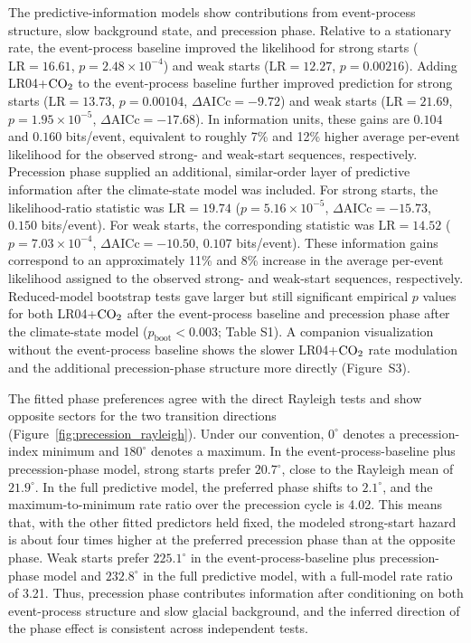 \documentclass[11pt]{article}
\begin{document}
The predictive-information models show contributions from event-process structure, slow background state, and precession phase.
Relative to a stationary rate, the event-process baseline improved the likelihood for strong starts (\(\mathrm{LR}=16.61\), \(p=2.48\times10^{-4}\)) and weak starts (\(\mathrm{LR}=12.27\), \(p=0.00216\)).
Adding LR04+\(\ce{CO2}\) to the event-process baseline further improved prediction for strong starts (\(\mathrm{LR}=13.73\), \(p=0.00104\), \(\Delta\mathrm{AICc}=-9.72\)) and weak starts (\(\mathrm{LR}=21.69\), \(p=1.95\times10^{-5}\), \(\Delta\mathrm{AICc}=-17.68\)).
In information units, these gains are \(0.104\) and \(0.160\) bits/event, equivalent to roughly 7\% and 12\% higher average per-event likelihood for the observed strong- and weak-start sequences, respectively.
Precession phase supplied an additional, similar-order layer of predictive information after the climate-state model was included.
For strong starts, the likelihood-ratio statistic was \(\mathrm{LR}=19.74\) (\(p=5.16\times10^{-5}\), \(\Delta\mathrm{AICc}=-15.73\), \(0.150\) bits/event).
For weak starts, the corresponding statistic was \(\mathrm{LR}=14.52\) (\(p=7.03\times10^{-4}\), \(\Delta\mathrm{AICc}=-10.50\), \(0.107\) bits/event).
These information gains correspond to an approximately 11\% and 8\% increase in the average per-event likelihood assigned to the observed strong- and weak-start sequences, respectively.
Reduced-model bootstrap tests gave larger but still significant empirical \(p\) values for both LR04+\(\ce{CO2}\) after the event-process baseline and precession phase after the climate-state model (\(p_\mathrm{boot}<0.003\); Table S1).
A companion visualization without the event-process baseline shows the slower LR04+\(\ce{CO2}\) rate modulation and the additional precession-phase structure more directly (Figure~S3).

The fitted phase preferences agree with the direct Rayleigh tests and show opposite sectors for the two transition directions (Figure~\ref{fig:precession_rayleigh}). Under our convention, \(0^\circ\) denotes a precession-index minimum and \(180^\circ\) denotes a maximum. In the event-process-baseline plus precession-phase model, strong starts prefer \(20.7^\circ\), close to the Rayleigh mean of \(21.9^\circ\). In the full predictive model, the preferred phase shifts to \(2.1^\circ\), and the maximum-to-minimum rate ratio over the precession cycle is 4.02. This means that, with the other fitted predictors held fixed, the modeled strong-start hazard is about four times higher at the preferred precession phase than at the opposite phase. Weak starts prefer \(225.1^\circ\) in the event-process-baseline plus precession-phase model and \(232.8^\circ\) in the full predictive model, with a full-model rate ratio of 3.21. Thus, precession phase contributes information after conditioning on both event-process structure and slow glacial background, and the inferred direction of the phase effect is consistent across independent tests.
\end{document}
